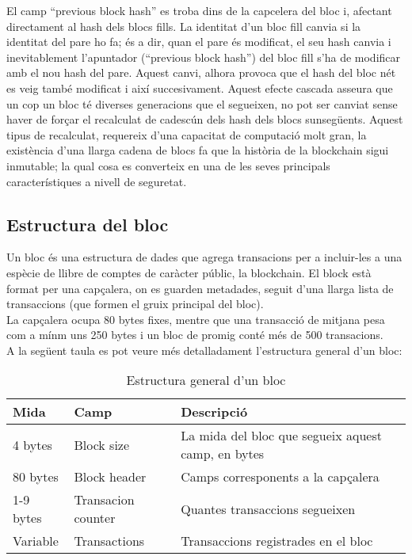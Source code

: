 \newline El camp “previous block hash” es troba dins de la capcelera del bloc i, afectant directament al hash dels blocs fills. La identitat d’un bloc fill canvia si la identitat del pare ho fa; és a dir, quan el pare és modificat, el seu hash canvia i inevitablement l’apuntador (“previous block hash”) del bloc fill s’ha de modificar amb el nou hash del pare. Aquest canvi, alhora provoca que el hash del bloc nét es veig també modificat i així succesivament. Aquest efecte cascada asseura que un cop un bloc té diverses generacions que el segueixen, no pot ser canviat sense haver de forçar el recalculat de cadescún dels hash dels blocs sunsegüents. Aquest tipus de recalculat, requereix d’una capacitat de computació molt gran, la existència d’una llarga cadena de blocs fa que la història de la blockchain sigui inmutable; la qual cosa es converteix en una de les seves principals característiques a nivell de seguretat.

\subsection{Estructura del bloc}
Un bloc és una estructura de dades que agrega transacions per a incluir-les a una espècie de llibre de comptes de caràcter públic, la blockchain. El block està format per una capçalera, on es guarden metadades, seguit d’una llarga lista de transaccions (que formen el gruix principal del bloc). \\
\newline La capçalera ocupa 80 bytes fixes, mentre que una transacció de mitjana pesa com a mínm uns 250 bytes i un bloc de promig conté més de 500 transacions.\\
\newline A la següent taula es pot veure més detalladament l'estructura general d'un bloc:
\begin{table}[ht]
    \centering
    \begin{tabular}{|l|l|l|} 
    \hline
    \textbf{Mida} & \textbf{Camp} & \textbf{Descripció} \\ [0.2ex] 
    \hline
    4 bytes & Block size & La mida del bloc que segueix aquest camp, en bytes \\
    80 bytes & Block header & Camps corresponents a la capçalera  \\
    1-9 bytes & Transacion counter & Quantes transaccions segueixen \\
    Variable & Transactions & Transaccions registrades en el bloc  \\[0.1ex] 
    \hline
    \end{tabular}
    \caption{Estructura general d'un bloc}
    \label{block_structure}
\end{table}

